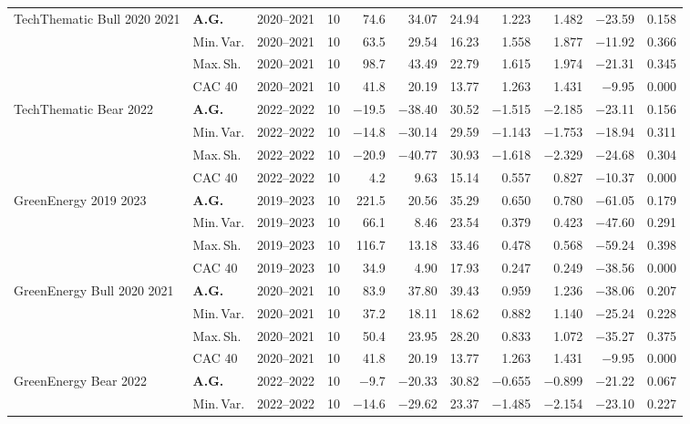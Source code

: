 \begin{longtable}{p{2.6cm} l c c r r r r r r r}
\midrule
TechThematic Bull 2020 2021 & \textbf{A.G.} & 2020--2021 & 10 & 74.6 & 34.07 & 24.94 & 1.223 & 1.482 & $-$23.59 & 0.158 \\
 & Min.\,Var. & 2020--2021 & 10 & 63.5 & 29.54 & 16.23 & 1.558 & 1.877 & $-$11.92 & 0.366 \\
 & Max.\,Sh. & 2020--2021 & 10 & 98.7 & 43.49 & 22.79 & 1.615 & 1.974 & $-$21.31 & 0.345 \\
 & CAC 40 & 2020--2021 & 10 & 41.8 & 20.19 & 13.77 & 1.263 & 1.431 & $-$9.95 & 0.000 \\
\midrule
TechThematic Bear 2022 & \textbf{A.G.} & 2022--2022 & 10 & $-$19.5 & $-$38.40 & 30.52 & $-$1.515 & $-$2.185 & $-$23.11 & 0.156 \\
 & Min.\,Var. & 2022--2022 & 10 & $-$14.8 & $-$30.14 & 29.59 & $-$1.143 & $-$1.753 & $-$18.94 & 0.311 \\
 & Max.\,Sh. & 2022--2022 & 10 & $-$20.9 & $-$40.77 & 30.93 & $-$1.618 & $-$2.329 & $-$24.68 & 0.304 \\
 & CAC 40 & 2022--2022 & 10 & 4.2 & 9.63 & 15.14 & 0.557 & 0.827 & $-$10.37 & 0.000 \\
\midrule
GreenEnergy 2019 2023 & \textbf{A.G.} & 2019--2023 & 10 & 221.5 & 20.56 & 35.29 & 0.650 & 0.780 & $-$61.05 & 0.179 \\
 & Min.\,Var. & 2019--2023 & 10 & 66.1 & 8.46 & 23.54 & 0.379 & 0.423 & $-$47.60 & 0.291 \\
 & Max.\,Sh. & 2019--2023 & 10 & 116.7 & 13.18 & 33.46 & 0.478 & 0.568 & $-$59.24 & 0.398 \\
 & CAC 40 & 2019--2023 & 10 & 34.9 & 4.90 & 17.93 & 0.247 & 0.249 & $-$38.56 & 0.000 \\
\midrule
GreenEnergy Bull 2020 2021 & \textbf{A.G.} & 2020--2021 & 10 & 83.9 & 37.80 & 39.43 & 0.959 & 1.236 & $-$38.06 & 0.207 \\
 & Min.\,Var. & 2020--2021 & 10 & 37.2 & 18.11 & 18.62 & 0.882 & 1.140 & $-$25.24 & 0.228 \\
 & Max.\,Sh. & 2020--2021 & 10 & 50.4 & 23.95 & 28.20 & 0.833 & 1.072 & $-$35.27 & 0.375 \\
 & CAC 40 & 2020--2021 & 10 & 41.8 & 20.19 & 13.77 & 1.263 & 1.431 & $-$9.95 & 0.000 \\
\midrule
GreenEnergy Bear 2022 & \textbf{A.G.} & 2022--2022 & 10 & $-$9.7 & $-$20.33 & 30.82 & $-$0.655 & $-$0.899 & $-$21.22 & 0.067 \\
 & Min.\,Var. & 2022--2022 & 10 & $-$14.6 & $-$29.62 & 23.37 & $-$1.485 & $-$2.154 & $-$23.10 & 0.227 \\

\end{longtable}
